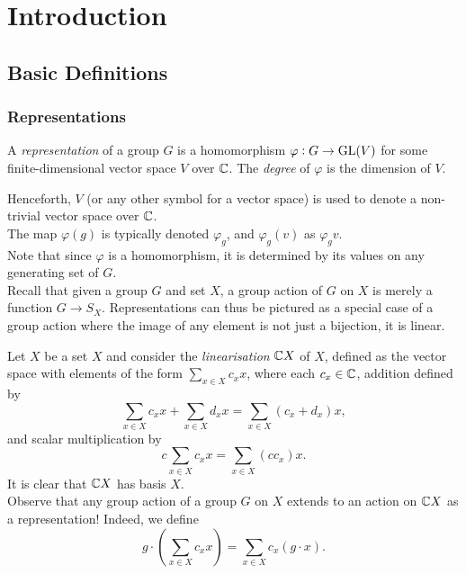 \section{Introduction}

	\subsection{Basic Definitions}

		\subsubsection{Representations}

			\begin{fdef}[Representation]
				\label{def: representation}
				A \emph{representation} of a group $G$ is a homomorphism $\varphi : G \to \operatorname{GL}(V)$ for some finite-dimensional vector space $V$ over $\mathbb{C}$. The \emph{degree} of $\varphi$ is the dimension of $V$.
			\end{fdef}
			Henceforth, $V$ (or any other symbol for a vector space) is used to denote a non-trivial vector space over $\mathbb{C}$.\\
			The map $\varphi(g)$ is typically denoted $\varphi_g$, and $\varphi_g(v)$ as $\varphi_gv$.\\
			Note that since $\varphi$ is a homomorphism, it is determined by its values on any generating set of $G$.\\
			Recall that given a group $G$ and set $X$, a group action of $G$ on $X$ is merely a function $G \to S_X$. Representations can thus be pictured as a special case of a group action where the image of any element is not just a bijection, it is linear.

			\begin{fex}
				Let $X$ be a set $X$ and consider the \emph{linearisation} $\mathbb{C} X$ of $X$, defined as the vector space with elements of the form $\sum_{x \in X} c_x x$, where each $c_x \in \mathbb{C}$, addition defined by
				\[ \sum_{x \in X} c_x x + \sum_{x \in X} d_x x = \sum_{x \in X} (c_x + d_x) x, \]
				and scalar multiplication by
				\[ c \sum_{x \in X} c_x x = \sum_{x \in X} (cc_x) x. \]
				It is clear that $\mathbb{C} X$ has basis $X$.\\
				Observe that any group action of a group $G$ on $X$ extends to an action on $\mathbb{C} X$ as a representation! Indeed, we define
				\[ g \cdot \left( \sum_{x \in X} c_x x \right) = \sum_{x \in X} c_x (g\cdot x). \]
			\end{fex}

